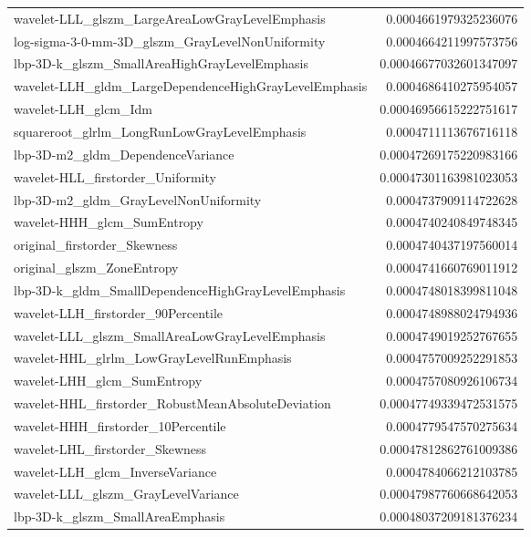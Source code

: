 {\begin{xltabular}[H]{\textwidth}{X r}
        wavelet-LLL\_glszm\_LargeAreaLowGrayLevelEmphasis & 0.0004661979325236076 \\
        log-sigma-3-0-mm-3D\_glszm\_GrayLevelNonUniformity & 0.0004664211997573756 \\
        lbp-3D-k\_glszm\_SmallAreaHighGrayLevelEmphasis & 0.00046677032601347097 \\
        wavelet-LLH\_gldm\_LargeDependenceHighGrayLevelEmphasis & 0.0004686410275954057 \\
        wavelet-LLH\_glcm\_Idm & 0.00046956615222751617 \\
        squareroot\_glrlm\_LongRunLowGrayLevelEmphasis & 0.0004711113676716118 \\
        lbp-3D-m2\_gldm\_DependenceVariance & 0.00047269175220983166 \\
        wavelet-HLL\_firstorder\_Uniformity & 0.00047301163981023053 \\
        lbp-3D-m2\_gldm\_GrayLevelNonUniformity & 0.0004737909114722628 \\
        wavelet-HHH\_glcm\_SumEntropy & 0.0004740240849748345 \\
        original\_firstorder\_Skewness & 0.0004740437197560014 \\
        original\_glszm\_ZoneEntropy & 0.0004741660769011912 \\
        lbp-3D-k\_gldm\_SmallDependenceHighGrayLevelEmphasis & 0.0004748018399811048 \\
        wavelet-LLH\_firstorder\_90Percentile & 0.0004748988024794936 \\
        wavelet-LLL\_glszm\_SmallAreaLowGrayLevelEmphasis & 0.0004749019252767655 \\
        wavelet-HHL\_glrlm\_LowGrayLevelRunEmphasis & 0.0004757009252291853 \\
        wavelet-LHH\_glcm\_SumEntropy & 0.0004757080926106734 \\
        wavelet-HHL\_firstorder\_RobustMeanAbsoluteDeviation & 0.00047749339472531575 \\
        wavelet-HHH\_firstorder\_10Percentile & 0.0004779547570275634 \\
        wavelet-LHL\_firstorder\_Skewness & 0.00047812862761009386 \\
        wavelet-LLH\_glcm\_InverseVariance & 0.0004784066212103785 \\
        wavelet-LLL\_glszm\_GrayLevelVariance & 0.00047987760668642053 \\
        lbp-3D-k\_glszm\_SmallAreaEmphasis & 0.00048037209181376234 \\

\end{xltabular}}

